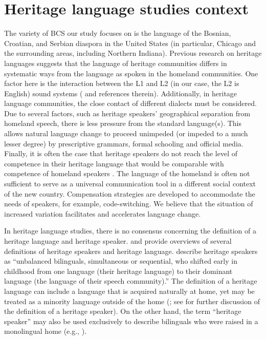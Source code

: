 \documentclass[output=paper,modfonts,newtxmath,hidelinks,]{langscibook}
\begin{document}
\section{Heritage language studies context}\label{sec:mihajlovic:2}

The variety of BCS our study focuses on is the language of the Bosnian, Croatian, and Serbian diaspora in the United States (in particular, Chicago and the surrounding areas, including Northern Indiana). Previous research on heritage languages suggests that the language of heritage communities differs in systematic ways from the language as spoken in the homeland communities. One factor here is the interaction between the L1 and L2 (in our case, the L2 is English) sound systems (\citealt{Polinsky2018} and references therein). Additionally, in heritage language communities, the close contact of different dialects must be considered. Due to several factors, such as heritage speakers’ geographical separation from homeland speech, there is less pressure from the standard language(s). This allows natural language change to proceed unimpeded (or impeded to a much lesser degree) by prescriptive grammars, formal schooling and official media. Finally, it is often the case that heritage speakers do not reach the level of competence in their heritage language that would be comparable with competence of homeland speakers \citep{Scontras-etal2015}. The language of the homeland is often not sufficient to serve as a universal communication tool in a different social context of the new country. Compensation strategies are developed to accommodate the needs of speakers, for example, code-switching. We believe that the situation of increased variation facilitates and accelerates language change.



In heritage language studies, there is no consensus concerning the definition of a heritage language and heritage speaker. \citet{Polinsky2018} and \citet{Kelleher2010} provide overviews of several definitions of heritage speakers and heritage language. \citet[1]{Scontras-etal2015} describe heritage speakers as “unbalanced bilinguals, simultaneous or sequential, who shifted early in childhood from one language (their heritage language) to their dominant language (the language of their speech community).” The definition of a heritage language can include a language that is acquired naturally at home, yet may be treated as a minority language outside of the home (\citealt{Polinsky2018}; see \citealt{Kupisch-etal2014} for further discussion of the definition of a heritage speaker). On the other hand, the term “heritage speaker” may also be used exclusively to describe bilinguals who were raised in a monolingual home (e.g., \citealt{Polinsky-Kagan2007}).
\end{document}
